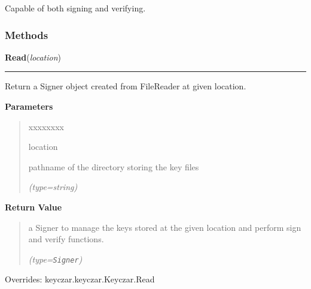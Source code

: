 Capable of both signing and verifying.



  \subsubsection{Methods}

    \vspace{0.5ex}

\hspace{.8\funcindent}\begin{boxedminipage}{\funcwidth}

    \raggedright \textbf{Read}(\textit{location})

    \vspace{-1.5ex}

    \rule{\textwidth}{0.5\fboxrule}
\setlength{\parskip}{2ex}
    Return a Signer object created from FileReader at given location.

\setlength{\parskip}{1ex}
      \textbf{Parameters}
      \vspace{-1ex}

      \begin{quote}
        \begin{Ventry}{xxxxxxxx}

          \item[location]

          pathname of the directory storing the key files

            {\it (type=string)}

        \end{Ventry}

      \end{quote}

      \textbf{Return Value}
    \vspace{-1ex}

      \begin{quote}
      a Signer to manage the keys stored at the given location and perform 
      sign and verify functions.

      {\it (type=\texttt{Signer})}

      \end{quote}

      Overrides: keyczar.keyczar.Keyczar.Read

    \end{boxedminipage}

